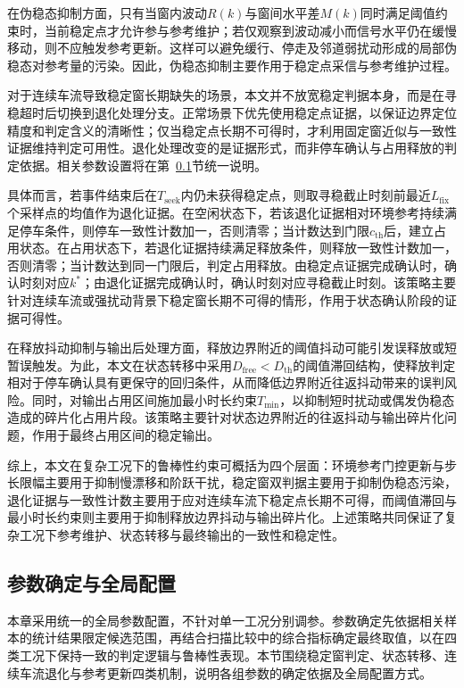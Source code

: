 \documentclass{xdupgthesis}
\begin{document}
在伪稳态抑制方面，只有当窗内波动$R(k)$与窗间水平差$M(k)$同时满足阈值约束时，当前稳定点才允许参与参考维护；若仅观察到波动减小而信号水平仍在缓慢移动，则不应触发参考更新。这样可以避免缓行、停走及邻道弱扰动形成的局部伪稳态对参考量的污染。因此，伪稳态抑制主要作用于稳定点采信与参考维护过程。

对于连续车流导致稳定窗长期缺失的场景，本文并不放宽稳定判据本身，而是在寻稳超时后切换到退化处理分支。正常场景下优先使用稳定点证据，以保证边界定位精度和判定含义的清晰性；仅当稳定点长期不可得时，才利用固定窗近似与一致性证据维持判定可用性。退化处理改变的是证据形式，而非停车确认与占用释放的判定依据。相关参数设置将在第~\ref{subsec:ch4_paramset}节统一说明。

具体而言，若事件结束后在$T_{\mathrm{seek}}$内仍未获得稳定点，则取寻稳截止时刻前最近$L_{\mathrm{fix}}$个采样点的均值作为退化证据。在空闲状态下，若该退化证据相对环境参考持续满足停车条件，则停车一致性计数加一，否则清零；当计数达到门限$c_{\mathrm{th}}$后，建立占用状态。在占用状态下，若退化证据持续满足释放条件，则释放一致性计数加一，否则清零；当计数达到同一门限后，判定占用释放。由稳定点证据完成确认时，确认时刻对应$k^\ast$；由退化证据完成确认时，确认时刻对应寻稳截止时刻。该策略主要针对连续车流或强扰动背景下稳定窗长期不可得的情形，作用于状态确认阶段的证据可得性。

在释放抖动抑制与输出后处理方面，释放边界附近的阈值抖动可能引发误释放或短暂误触发。为此，本文在状态转移中采用$D_{\mathrm{free}}<D_{\mathrm{th}}$的阈值滞回结构，使释放判定相对于停车确认具有更保守的回归条件，从而降低边界附近往返抖动带来的误判风险。同时，对输出占用区间施加最小时长约束$T_{\min}$，以抑制短时扰动或偶发伪稳态造成的碎片化占用片段。该策略主要针对状态边界附近的往返抖动与输出碎片化问题，作用于最终占用区间的稳定输出。

综上，本文在复杂工况下的鲁棒性约束可概括为四个层面：环境参考门控更新与步长限幅主要用于抑制慢漂移和阶跃干扰，稳定窗双判据主要用于抑制伪稳态污染，退化证据与一致性计数主要用于应对连续车流下稳定点长期不可得，而阈值滞回与最小时长约束则主要用于抑制释放边界抖动与输出碎片化。上述策略共同保证了复杂工况下参考维护、状态转移与最终输出的一致性和稳定性。

\subsection{参数确定与全局配置}
\label{subsec:ch4_paramset}

本章采用统一的全局参数配置，不针对单一工况分别调参。参数确定先依据相关样本的统计结果限定候选范围，再结合扫描比较中的综合指标确定最终取值，以在四类工况下保持一致的判定逻辑与鲁棒性表现。本节围绕稳定窗判定、状态转移、连续车流退化与参考更新四类机制，说明各组参数的确定依据及全局配置方式。
\end{document}

